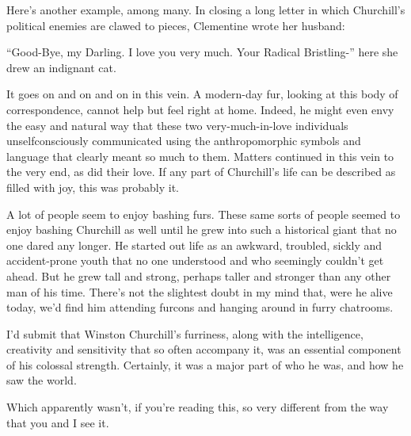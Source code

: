 Here's another example, among many. In closing a long letter in which Churchill's political enemies are clawed to pieces, Clementine wrote her husband:

``Good-Bye, my Darling. I love you very much. Your Radical Bristling-'' here she drew an indignant cat.

It goes on and on and on in this vein. A modern-day fur, looking at this body of correspondence, cannot help but feel right at home. Indeed, he might even envy the easy and natural way that these two very-much-in-love individuals unselfconsciously communicated using the anthropomorphic symbols and language that clearly meant so much to them. Matters continued in this vein to the very end, as did their love. If any part of Churchill's life can be described as filled with joy, this was probably it.

A lot of people seem to enjoy bashing furs. These same sorts of people seemed to enjoy bashing Churchill as well until he grew into such a historical giant that no one dared any longer. He started out life as an awkward, troubled, sickly and accident-prone youth that no one understood and who seemingly couldn't get ahead. But he grew tall and strong, perhaps taller and stronger than any other man of his time. There's not the slightest doubt in my mind that, were he alive today, we'd find him attending furcons and hanging around in furry chatrooms.

I'd submit that Winston Churchill's furriness, along with the intelligence, creativity and sensitivity that so often accompany it, was an essential component of his colossal strength. Certainly, it was a major part of who he was, and how he saw the world.

Which apparently wasn't, if you're reading this, so very different from the way that you and I see it.

